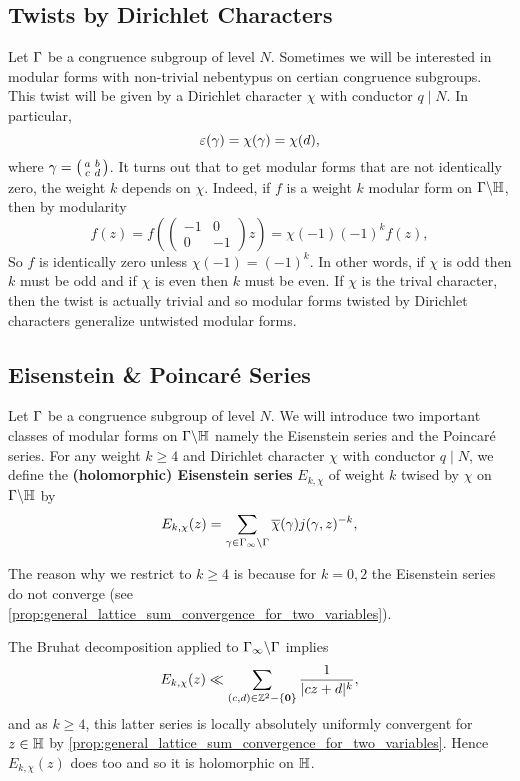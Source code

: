     \subsection*{Twists by Dirichlet Characters}
      Let $\Gamma$ be a congruence subgroup of level $N$. Sometimes we will be interested in modular forms with non-trivial nebentypus on certian congruence subgroups. This twist will be given by a Dirichlet character $\chi$ with conductor $q \mid N$. In particular,
      \[
        \varepsilon(\gamma) = \chi(\gamma) = \chi(d),
      \]
      where $\gamma = \begin{psmallmatrix} a & b \\ c & d \end{psmallmatrix}$. It turns out that to get modular forms that are not identically zero, the weight $k$ depends on $\chi$. Indeed, if $f$ is a weight $k$ modular form on $\Gamma\backslash\mathbb{H}$, then by modularity
      \[
        f(z) = f\left(\begin{pmatrix} -1 & 0 \\ 0 & -1 \end{pmatrix}z\right) = \chi(-1)(-1)^{k}f(z),
      \]
      So $f$ is identically zero unless $\chi(-1) = (-1)^{k}$. In other words, if $\chi$ is odd then $k$ must be odd and if $\chi$ is even then $k$ must be even. If $\chi$ is the trival character, then the twist is actually trivial and so modular forms twisted by Dirichlet characters generalize untwisted modular forms.
    \subsection*{Eisenstein \& Poincar\'e Series}
      Let $\Gamma$ be a congruence subgroup of level $N$. We will introduce two important classes of modular forms on $\Gamma\backslash\mathbb{H}$ namely the Eisenstein series and the Poincar\'e series. For any weight $k \ge 4$ and Dirichlet character $\chi$ with conductor $q \mid N$, we define the \textbf{(holomorphic) Eisenstein series} $E_{k,\chi}$ of weight $k$ twised by $\chi$ on $\Gamma\backslash\mathbb{H}$ by
      \[
        E_{k,\chi}(z) = \sum_{\gamma \in \Gamma_{\infty}\backslash\Gamma}\overline{\chi}(\gamma)j(\gamma,z)^{-k},
      \]

      \begin{remark}
        The reason why we restrict to $k \ge 4$ is because for $k = 0,2$ the Eisenstein series do not converge (see \cref{prop:general_lattice_sum_convergence_for_two_variables}).
      \end{remark}

      The Bruhat decomposition applied to $\Gamma_{\infty}\backslash\Gamma$ implies
      \[
        E_{k,\chi}(z) \ll \sum_{(c,d) \in \mathbb{Z}^{2}-\{\mathbf{0}\}}\frac{1}{|cz+d|^{k}},
      \]
      and as $k \ge 4$, this latter series is locally absolutely uniformly convergent for $z \in \mathbb{H}$ by \cref{prop:general_lattice_sum_convergence_for_two_variables}. Hence $E_{k,\chi}(z)$ does too and so it is holomorphic on $\mathbb{H}$.

